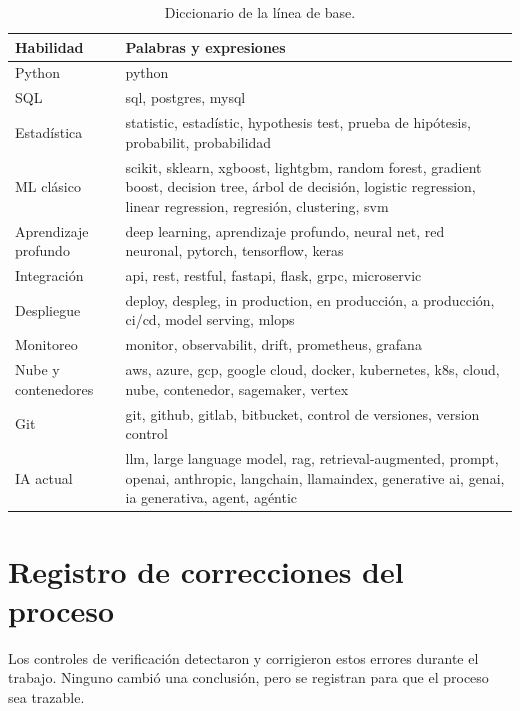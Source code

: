 \documentclass[11pt,a4paper]{article}
\begin{document}
\begin{table}[H]
\centering\small
\begin{tabularx}{\textwidth}{L{3.2cm} X}
\toprule
{}\textbf{Habilidad} & \textbf{Palabras y expresiones}\\
\midrule
Python & python\\
SQL & sql, postgres, mysql\\
Estadística & statistic, estadístic, hypothesis test, prueba de hipótesis, probabilit, probabilidad\\
ML clásico & scikit, sklearn, xgboost, lightgbm, random forest, gradient boost, decision tree, árbol de decisión, logistic regression, linear regression, regresión, clustering, svm\\
Aprendizaje profundo & deep learning, aprendizaje profundo, neural net, red neuronal, pytorch, tensorflow, keras\\
Integración & api, rest, restful, fastapi, flask, grpc, microservic\\
Despliegue & deploy, despleg, in production, en producción, a producción, ci/cd, model serving, mlops\\
Monitoreo & monitor, observabilit, drift, prometheus, grafana\\
Nube y contenedores & aws, azure, gcp, google cloud, docker, kubernetes, k8s, cloud, nube, contenedor, sagemaker, vertex\\
Git & git, github, gitlab, bitbucket, control de versiones, version control\\
IA actual & llm, large language model, rag, retrieval-augmented, prompt, openai, anthropic, langchain, llamaindex, generative ai, genai, ia generativa, agent, agéntic\\
\bottomrule
\end{tabularx}
\caption{Diccionario de la línea de base.}
\end{table}

\section{Registro de correcciones del proceso}
Los controles de verificación detectaron y corrigieron estos errores durante el trabajo. Ninguno cambió una conclusión, pero se registran para que el proceso sea trazable.
\end{document}
